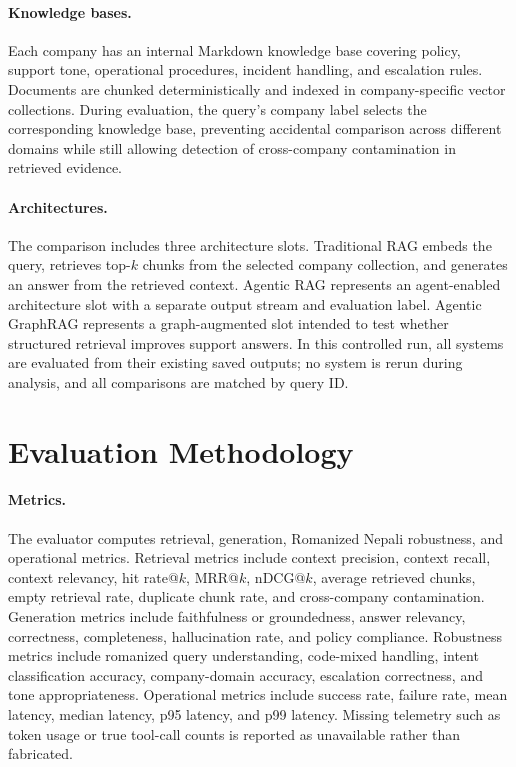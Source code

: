 \documentclass[10pt,twocolumn]{article}
\begin{document}
\paragraph{Knowledge bases.}
Each company has an internal Markdown knowledge base covering policy, support tone, operational procedures, incident handling, and escalation rules. Documents are chunked deterministically and indexed in company-specific vector collections. During evaluation, the query's company label selects the corresponding knowledge base, preventing accidental comparison across different domains while still allowing detection of cross-company contamination in retrieved evidence.

\paragraph{Architectures.}
The comparison includes three architecture slots. Traditional RAG embeds the query, retrieves top-$k$ chunks from the selected company collection, and generates an answer from the retrieved context. Agentic RAG represents an agent-enabled architecture slot with a separate output stream and evaluation label. Agentic GraphRAG represents a graph-augmented slot intended to test whether structured retrieval improves support answers. In this controlled run, all systems are evaluated from their existing saved outputs; no system is rerun during analysis, and all comparisons are matched by query ID.

\section{Evaluation Methodology}

\paragraph{Metrics.}
The evaluator computes retrieval, generation, Romanized Nepali robustness, and operational metrics. Retrieval metrics include context precision, context recall, context relevancy, hit rate@$k$, MRR@$k$, nDCG@$k$, average retrieved chunks, empty retrieval rate, duplicate chunk rate, and cross-company contamination. Generation metrics include faithfulness or groundedness, answer relevancy, correctness, completeness, hallucination rate, and policy compliance. Robustness metrics include romanized query understanding, code-mixed handling, intent classification accuracy, company-domain accuracy, escalation correctness, and tone appropriateness. Operational metrics include success rate, failure rate, mean latency, median latency, p95 latency, and p99 latency. Missing telemetry such as token usage or true tool-call counts is reported as unavailable rather than fabricated.
\end{document}
